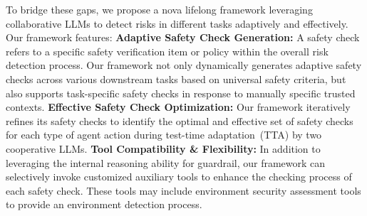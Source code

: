 To bridge these gaps,  we propose a nova lifelong framework leveraging collaborative LLMs to detect risks in different tasks adaptively and effectively.  Our framework features:  \textbf{Adaptive Safety Check Generation: }A safety check refers to a specific safety verification item or policy within the overall risk detection process. Our framework not only dynamically generates adaptive safety checks across various downstream tasks based on universal safety criteria, but also supports task-specific safety checks in response to manually specific trusted contexts. \textbf{Effective Safety Check Optimization: }Our framework iteratively refines its safety checks to identify the optimal and effective set of safety checks for each type of agent action during test-time adaptation~(TTA) by two cooperative LLMs.
 \textbf{Tool Compatibility \& Flexibility: } In addition to leveraging the internal reasoning ability for guardrail, our framework can selectively invoke customized auxiliary tools to enhance the checking process of each safety check. These tools may include environment security assessment tools to provide an environment detection process.


